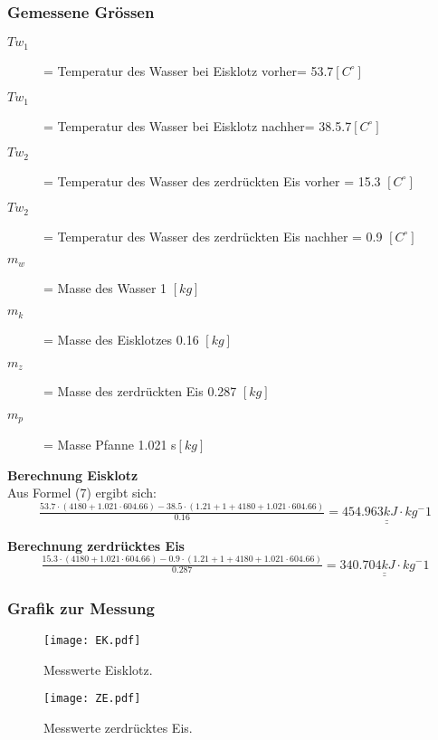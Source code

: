 \documentclass{article}
\begin{document}
\subsubsection{Gemessene Grössen}
  \begin{description}
    \item[\textbf{ $Tw_1$}]= Temperatur des Wasser bei Eisklotz vorher= 53.7$[C^\circ]$ 
        \item[\textbf{ $Tw_1$}]= Temperatur des Wasser bei Eisklotz nachher= 38.5.7$[C^\circ]$ 
     \item[\textbf{ $Tw_2$}]= Temperatur des Wasser des zerdrückten Eis vorher =  15.3 $[C^\circ]$ 
          \item[\textbf{ $Tw_2$}]= Temperatur des Wasser des zerdrückten Eis nachher =  0.9 $[C^\circ]$ 
    \item[\textbf{ $m_w$}]= Masse des Wasser 1 $[kg]$
     \item[\textbf{ $m_k$}]= Masse des Eisklotzes 0.16 $[kg]$
    \item[\textbf{ $m_z$}]= Masse des zerdrückten Eis 0.287 $[kg]$
      \item[\textbf{ $m_p$}]= Masse Pfanne 1.021 s$[kg]$
  \end{description}
 \textbf{Berechnung Eisklotz}\\
 Aus Formel (7) ergibt sich:
 \begin{equation}
 \tfrac{53.7 \cdot (4180+1.021 \cdot 604.66)-38.5\cdot (1.21+1+4180+1.021 \cdot 604.66)}{0.16} = \underline{\underline{454.963kJ \cdot kg^-1}} 
 \end{equation}  
 
  \textbf{Berechnung zerdrücktes Eis}\\
  \begin{equation}
 \tfrac{15.3 \cdot (4180+1.021 \cdot 604.66)-0.9\cdot (1.21+1+4180+1.021 \cdot 604.66)}{0.287} = \underline{\underline{340.704kJ \cdot kg^-1}} 
 \end{equation}  
 
 \subsubsection{Grafik zur Messung}
 \begin{figure}[H]
\texttt{[image: EK.pdf]} 
\caption{Messwerte Eisklotz.}
\end{figure}
 \begin{figure}[H]
\texttt{[image: ZE.pdf]} 
\caption{Messwerte zerdrücktes Eis.}
\end{figure}
\end{document}
